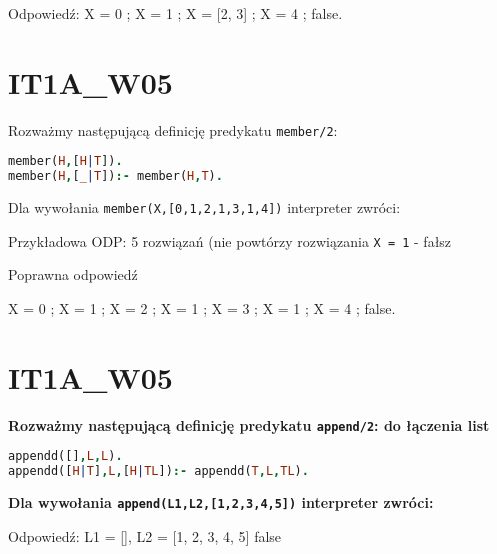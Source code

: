 Odpowiedź: \newline
X = 0 ; \newline
X = 1 ; \newline
X = [2, 3] ; \newline
X = 4 ; \newline
false. \newline


\section{IT1A\_W05}
Rozważmy następującą definicję predykatu \lstinline!member/2!:
\begin{lstlisting}[language=Prolog, frame=trbl]
member(H,[H|T]).
member(H,[_|T]):- member(H,T).
\end{lstlisting}
Dla wywołania \lstinline!member(X,[0,1,2,1,3,1,4])! interpreter zwróci:

Przykładowa ODP: 5 rozwiązań (nie powtórzy rozwiązania \lstinline!X = 1! - fałsz

Poprawna odpowiedź

X = 0 ; \newline
X = 1 ; \newline
X = 2 ; \newline
X = 1 ; \newline
X = 3 ; \newline
X = 1 ; \newline
X = 4 ; \newline
false. \newline


\section{IT1A\_W05}

\textbf{Rozważmy następującą definicję predykatu \lstinline!append/2!: do łączenia list}
\begin{lstlisting}[language=Prolog, frame=trbl]
appendd([],L,L).
appendd([H|T],L,[H|TL]):- appendd(T,L,TL).
\end{lstlisting}
\textbf{Dla wywołania \lstinline!append(L1,L2,[1,2,3,4,5])! interpreter zwróci:}
\vspace{0.4cm}

Odpowiedź: \newline
L1 = [], 			\newline
L2 = [1, 2, 3, 4, 5]\newline
false				\newline

